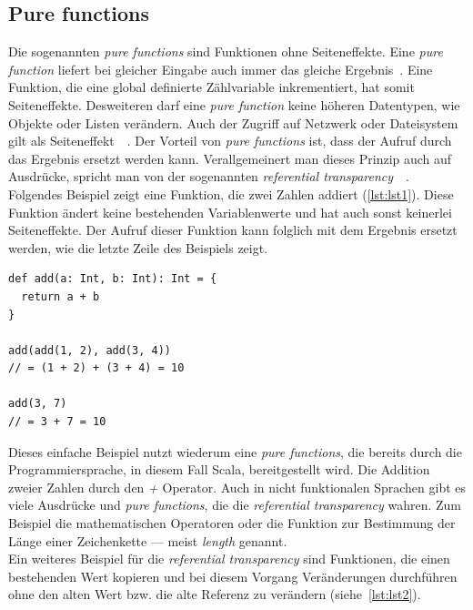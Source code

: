 \subsection{Pure functions}
Die sogenannten \textit{pure functions} sind Funktionen ohne Seiteneffekte. Eine \textit{pure function} liefert bei gleicher Eingabe auch immer das gleiche Ergebnis~\cite[S.~61]{kuhn_reactive_2015}. Eine Funktion, die eine global definierte Zählvariable inkrementiert, hat somit Seiteneffekte. Desweiteren darf eine \textit{pure function} keine höheren Datentypen, wie Objekte oder Listen verändern. Auch der Zugriff auf Netzwerk oder Dateisystem gilt als Seiteneffekt~\cite[S.~3]{chiusano_functional_2015}~\cite[S.~62]{kuhn_reactive_2015}.
Der Vorteil von \textit{pure functions} ist, dass der Aufruf durch das Ergebnis ersetzt werden kann. Verallgemeinert man dieses Prinzip auch auf Ausdrücke, spricht man von der sogenannten \textit{referential transparency}~\cite[S.~9]{chiusano_functional_2015}~\cite[S.~62]{kuhn_reactive_2015}. Folgendes Beispiel zeigt eine Funktion, die zwei Zahlen addiert (\ref{lst:lst1}). Diese Funktion ändert keine bestehenden Variablenwerte und hat auch sonst keinerlei Seiteneffekte. Der Aufruf dieser Funktion kann folglich mit dem Ergebnis ersetzt werden, wie die letzte Zeile des Beispiels zeigt.

\begin{lstlisting}[caption={Beispiel für eine \textit{pure funcition}},label={lst:lst1}]
def add(a: Int, b: Int): Int = {
  return a + b
}

add(add(1, 2), add(3, 4))
// = (1 + 2) + (3 + 4) = 10

add(3, 7)
// = 3 + 7 = 10
\end{lstlisting}

Dieses einfache Beispiel nutzt wiederum eine \textit{pure functions}, die bereits durch die Programmiersprache, in diesem Fall Scala, bereitgestellt wird. Die Addition zweier Zahlen durch den \textit{+} Operator. Auch in nicht funktionalen Sprachen gibt es viele Ausdrücke und \textit{pure functions}, die die \textit{referential transparency} wahren. Zum Beispiel die mathematischen Operatoren oder die Funktion zur Bestimmung der Länge einer Zeichenkette --- meist \textit{length} genannt.\\

Ein weiteres Beispiel für die \textit{referential transparency} sind Funktionen, die einen bestehenden Wert kopieren und bei diesem Vorgang Veränderungen durchführen ohne den alten Wert bzw. die alte Referenz zu verändern (siehe~\autoref{lst:lst2}).


